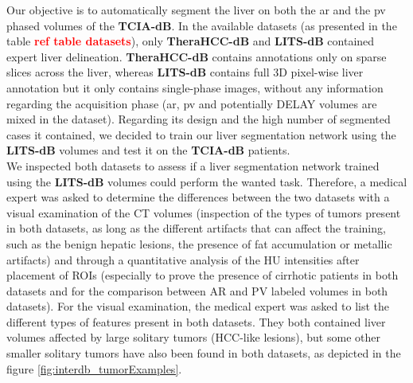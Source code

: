 \documentclass[]{article}
\newcommand{\lmttfont}[1]{{\fontfamily{lmtt}\selectfont #1}}
\begin{document}
Our objective is to automatically segment the liver on both the \ac{ar} and the \ac{pv} phased volumes of the \textbf{\lmttfont{TCIA-dB}}. In the available datasets (as presented in the table \textbf{\textcolor{red}{ref table datasets}}), only \textbf{\lmttfont{TheraHCC-dB}} and \textbf{\lmttfont{LITS-dB}} contained expert liver delineation. \textbf{\lmttfont{TheraHCC-dB}} contains annotations only on sparse slices across the liver, whereas \textbf{\lmttfont{LITS-dB}} contains full 3D pixel-wise liver annotation but it only contains single-phase images, without any information regarding the
acquisition phase (\ac{ar}, \ac{pv} and potentially DELAY volumes are mixed in the dataset).
Regarding its design and the high number of segmented cases it contained, we decided to train our liver segmentation network using the \textbf{\lmttfont{LITS-dB}} volumes and test it on the \textbf{\lmttfont{TCIA-dB}} patients.\\
We inspected both datasets to assess if a liver segmentation network trained using the \textbf{\lmttfont{LITS-dB}} volumes could perform the wanted task. Therefore, a medical expert was asked to determine the differences between the two datasets with a visual examination of the CT volumes (inspection of the types of tumors present in both datasets, as long as the different artifacts that can affect the training, such as the benign hepatic lesions, the presence of fat accumulation or metallic artifacts) and through a quantitative analysis of the HU intensities after placement of ROIs (especially to prove the presence of cirrhotic patients in both datasets and for the comparison between AR and PV labeled volumes in both datasets).
For the visual examination, the medical expert was asked to list the different types of features present in both datasets.
They both contained liver volumes affected by large solitary tumors (HCC-like lesions), but some other smaller solitary tumors have also been found in both datasets, as depicted in the figure \ref{fig:interdb_tumorExamples}.
\end{document}
